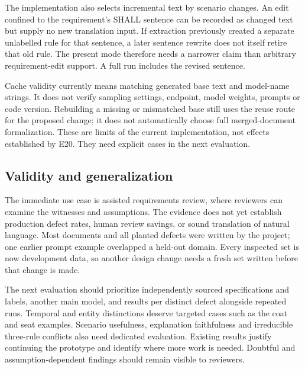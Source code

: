 The implementation also selects incremental text by scenario changes. An edit confined to the requirement's SHALL sentence can be recorded as changed text but supply no new translation input. If extraction previously created a separate unlabelled rule for that sentence, a later sentence rewrite does not itself retire that old rule. The present mode therefore needs a narrower claim than arbitrary requirement-edit support. A full run includes the revised sentence.

Cache validity currently means matching generated base text and model-name strings. It does not verify sampling settings, endpoint, model weights, prompts or code version. Rebuilding a missing or mismatched base still uses the reuse route for the proposed change; it does not automatically choose full merged-document formalization. These are limits of the current implementation, not effects established by E20. They need explicit cases in the next evaluation.

\subsection{Validity and generalization}

The immediate use case is assisted requirements review, where reviewers can
examine the witnesses and assumptions. The evidence does not yet establish
production defect rates, human review savings, or sound translation of natural
language. Most documents and all planted defects were written by the project;
one earlier prompt example overlapped a held-out domain. Every inspected set
is now development data, so another design change needs a fresh set written
before that change is made.

The next evaluation should prioritize independently sourced specifications and
labels, another main model, and results per distinct defect alongside repeated
runs. Temporal and entity distinctions deserve targeted cases such as the
coat and seat examples. Scenario usefulness, explanation faithfulness and
irreducible three-rule conflicts also need dedicated evaluation. Existing
results justify continuing the prototype and identify where more work is
needed. Doubtful and assumption-dependent findings should remain visible to
reviewers.
